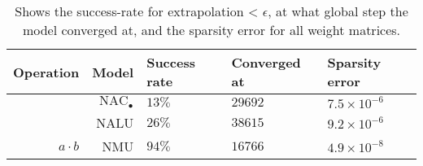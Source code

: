 \begin{table}[H]

\caption{\label{tab:very-simple-function-results}Shows the success-rate for extrapolation < $\epsilon$, at what global step the model converged at, and the sparsity error for all weight matrices.}
\centering
\begin{tabular}{rrlll}
\toprule
Operation & Model & Success rate & Converged at & Sparsity error\\
\midrule
 & ${\mathrm{NAC}_\bullet}$ & $13\%$ & $29692$ & $7.5 \times 10^{-6}$\\

 & NALU & $26\%$ & $38615$ & $9.2 \times 10^{-6}$\\

\multirow{-3}{*}{\raggedleft\arraybackslash $a \cdot b$} & NMU & $94\%$ & $16766$ & $4.9 \times 10^{-8}$\\
\bottomrule
\end{tabular}
\end{table}
